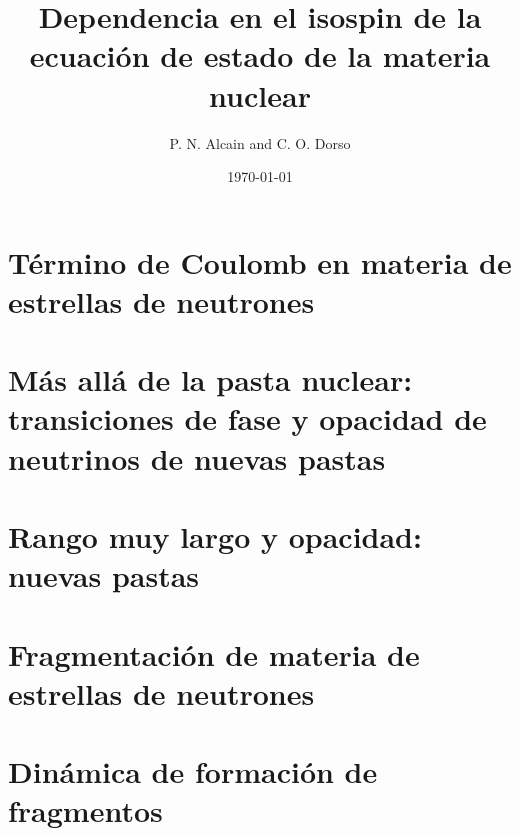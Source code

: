 \documentclass[12pt]{book}
\begin{document}
\title{Dependencia en el isospin de la ecuación de estado de la materia nuclear}

\author{P. N. Alcain and C. O. Dorso}

\date{\today}
\maketitle
\tableofcontents

\chapter[Efecto de Coulomb]{Término de Coulomb en materia de estrellas de neutrones}
\label{ch:coulomb}


\chapter[Transiciones de fase]{Más allá de la pasta nuclear: transiciones de fase y opacidad de neutrinos de nuevas pastas}
\label{ch:transicion}


\chapter[Nuevas pastas]{Rango muy largo y opacidad: nuevas pastas}
\label{ch:nuevas_pastas}


\chapter[Fragmentación]{Fragmentación de materia de estrellas de neutrones}
\label{ch:fragmentacion}


\chapter[Formación de fragmentos]{Dinámica de formación de fragmentos}
\label{ch:dinamica}

\end{document}
